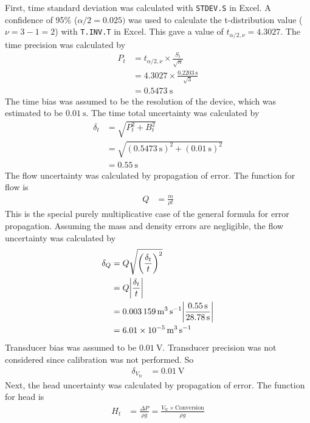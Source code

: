 First, time standard deviation was calculated with \texttt{STDEV.S} in Excel. A confidence of 95\% ($\alpha/2 = 0.025)$ was used to calculate the t-distribution value ($\nu = 3 - 1 = 2$) with \texttt{T.INV.T} in Excel. This gave a value of $t_{\alpha/2, \nu} = 4.3027$. The time precision was calculated by
\begin{align*}
    P_t &= t_{\alpha/2, \nu} \times \frac{S_t}{\sqrt{n}} \\
    &= 4.3027 \times \frac{\qty{0.2203}{\second}}{\sqrt{3}} \\
    &= \qty{0.5473}{\second}
\end{align*}
The time bias was assumed to be the resolution of the device, which was estimated to be $\qty{0.01}{\second}$. The time total uncertainty was calculated by
\begin{align*}
    \delta_t &= \sqrt{P_t^2 + B_t^2} \\
    &= \sqrt{(\qty{0.5473}{\second})^2 + (\qty{0.01}{\second})^2} \\
    &= \qty{0.55}{\second}
\end{align*}
The flow uncertainty was calculated by propagation of error. The function for flow is
\begin{align*}
    Q &= \frac{m}{\rho t} 
\end{align*}
This is the special purely multiplicative case of the general formula for error propagation. Assuming the mass and density errors are negligible, the flow uncertainty was calculated by
\begin{align*}
    \delta_Q &= Q \sqrt{\left(\frac{\delta_t}{t}\right)^2} \\
    &= Q \bigg|\frac{\delta_t}{t}\bigg| \\
    &= \qty{0.003159}{\meter\cubed\per\second} \bigg|\frac{\qty{0.55}{\second}}{\qty{28.78}{\second}}\bigg| \\
    &= \qty{6.01E-05}{\meter\cubed\per\second}
\end{align*}
Transducer bias was assumed to be $\qty{0.01}{\volt}$. Transducer precision was not considered since calibration was not performed. So 
\begin{align*}
    \delta_{V_{\text{tr}}} &= \qty{0.01}{\volt}
\end{align*}
Next, the head uncertainty was calculated by propagation of error. The function for head is
\begin{align*}
    H_t &= \frac{\Delta P}{\rho g} = \frac{V_{\text{tr}} \times \text{Conversion}}{\rho g}
\end{align*}
